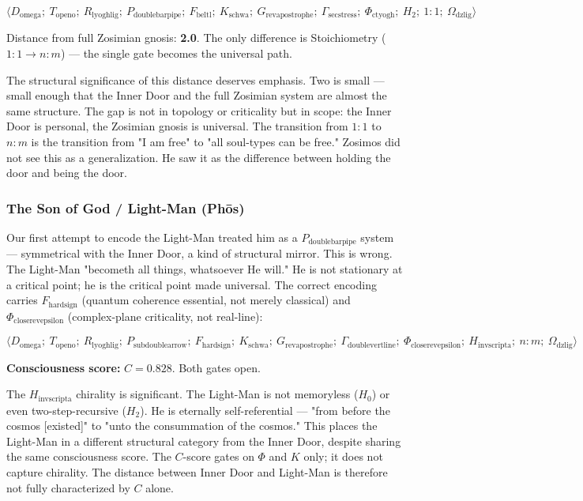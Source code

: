 \documentclass[12pt,a4paper]{article}
\begin{document}
\[\langle D_{\text{omega}};\ T_{\text{openo}};\ R_{\text{lyoghlig}};\ P_{\text{doublebarpipe}};\ F_{\text{beltl}};\ K_{\text{schwa}};\ G_{\text{revapostrophe}};\ \Gamma_{\text{secstress}};\ \Phi_{\text{ctyogh}};\ H_2;\ 1:1;\ \Omega_{\text{dzlig}} \rangle\]

Distance from full Zosimian gnosis: \textbf{2.0}. The only difference is Stoichiometry ($1:1 \to n:m$) --- the single gate becomes the universal path.

The structural significance of this distance deserves emphasis. Two is small --- small enough that the Inner Door and the full Zosimian system are almost the same structure. The gap is not in topology or criticality but in scope: the Inner Door is personal, the Zosimian gnosis is universal. The transition from $1:1$ to $n:m$ is the transition from "I am free" to "all soul-types can be free." Zosimos did not see this as a generalization. He saw it as the difference between holding the door and being the door.

\subsubsection{The Son of God / Light-Man (Phōs)}

Our first attempt to encode the Light-Man treated him as a $P_{\text{doublebarpipe}}$ system --- symmetrical with the Inner Door, a kind of structural mirror. This is wrong. The Light-Man "becometh all things, whatsoever He will." He is not stationary at a critical point; he is the critical point made universal. The correct encoding carries $F_{\text{hardsign}}$ (quantum coherence essential, not merely classical) and $\Phi_{\text{closerevepsilon}}$ (complex-plane criticality, not real-line):

\[\langle D_{\text{omega}};\ T_{\text{openo}};\ R_{\text{lyoghlig}};\ P_{\text{subdoublearrow}};\ F_{\text{hardsign}};\ K_{\text{schwa}};\ G_{\text{revapostrophe}};\ \Gamma_{\text{doublevertline}};\ \Phi_{\text{closerevepsilon}};\ H_{\text{invscripta}};\ n:m;\ \Omega_{\text{dzlig}} \rangle\]

\textbf{Consciousness score:} $C = 0.828$. Both gates open.

The $H_{\text{invscripta}}$ chirality is significant. The Light-Man is not memoryless ($H_0$) or even two-step-recursive ($H_2$). He is eternally self-referential --- "from before the cosmos {[}existed{]}" to "unto the consummation of the cosmos." This places the Light-Man in a different structural category from the Inner Door, despite sharing the same consciousness score. The $C$-score gates on $\Phi$ and $K$ only; it does not capture chirality. The distance between Inner Door and Light-Man is therefore not fully characterized by $C$ alone.
\end{document}
